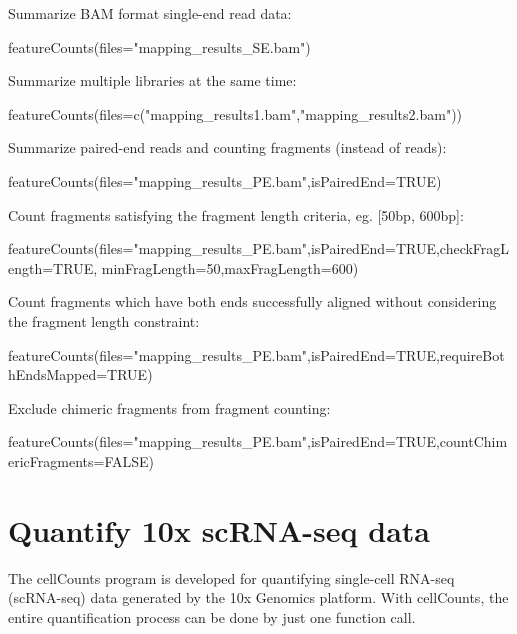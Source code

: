 \documentclass[12pt]{report}
\newcommand{\cellCounts}{\textsf{cellCounts}}
\begin{document}
\noindent Summarize BAM format single-end read data:

\begin{Rcode}
featureCounts(files="mapping_results_SE.bam")
\end{Rcode}

\noindent Summarize multiple libraries at the same time:

\begin{Rcode}
featureCounts(files=c("mapping_results1.bam","mapping_results2.bam"))
\end{Rcode}

\noindent Summarize paired-end reads and counting fragments (instead of reads):

\begin{Rcode}
featureCounts(files="mapping_results_PE.bam",isPairedEnd=TRUE)
\end{Rcode}

\noindent Count fragments satisfying the fragment length criteria, eg. [50bp, 600bp]:

\begin{Rcode}
featureCounts(files="mapping_results_PE.bam",isPairedEnd=TRUE,checkFragLength=TRUE,
minFragLength=50,maxFragLength=600)
\end{Rcode}

\noindent Count fragments which have both ends successfully aligned without considering the fragment length constraint:

\begin{Rcode}
featureCounts(files="mapping_results_PE.bam",isPairedEnd=TRUE,requireBothEndsMapped=TRUE)
\end{Rcode}

\noindent Exclude chimeric fragments from fragment counting:

\begin{Rcode}
featureCounts(files="mapping_results_PE.bam",isPairedEnd=TRUE,countChimericFragments=FALSE)
\end{Rcode}






\chapter{Quantify 10x scRNA-seq data}

The {\cellCounts} program is developed for quantifying single-cell RNA-seq (scRNA-seq) data generated by the 10x Genomics platform.
With {\cellCounts}, the entire quantification process can be done by just one function call.
\end{document}

